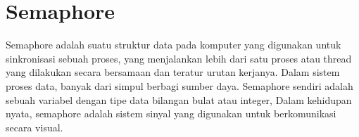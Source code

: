 \section{Semaphore}
Semaphore adalah suatu struktur data pada komputer yang digunakan untuk sinkronisasi sebuah proses, yang menjalankan lebih dari satu proses atau thread yang dilakukan secara bersamaan dan teratur urutan kerjanya. Dalam sistem proses data, banyak dari simpul berbagi sumber daya. 
Semaphore sendiri adalah sebuah variabel dengan tipe data bilangan bulat atau integer, Dalam kehidupan nyata, semaphore adalah sistem sinyal yang digunakan untuk berkomunikasi secara visual.
